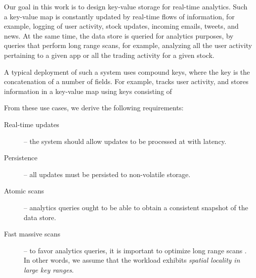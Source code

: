 
Our goal in this work is to design key-value storage for real-time analytics. 
Such a key-value map is constantly updated by real-time flows of information, for example, 
logging of user activity, stock updates, incoming emails, tweets, and news.
At the same time, the data store is queried for analytics purposes, by queries that 
perform long range scans, for example, analyzing all the user activity pertaining to a given app
or all the trading activity for a given stock. 

A typical deployment of such a system uses compound keys, where the key 
is the concatenation of a number of fields. For example,   tracks user activity, and stores information
in a key-value map using keys consisting of 


From these use cases, we derive the following requirements:
\begin{description}
\item[Real-time updates] -- the system should allow updates to be processed at  with  latency.  
\item[Persistence] -- all updates must be persisted  to non-volatile storage.
\item[Atomic scans] -- analytics queries ought to be able to obtain a consistent snapshot of the data store.
\item[Fast massive scans] -- to favor analytics queries, it is important to optimize long range scans 
.  In other words, we assume that the workload exhibits 
\emph{spatial locality in large key ranges}.
\end{description} 

